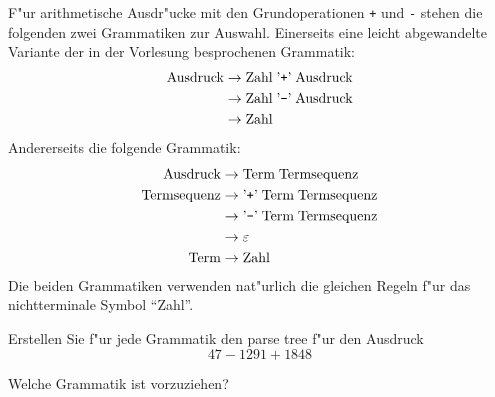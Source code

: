 F"ur arithmetische Ausdr"ucke mit den Grundoperationen
{\tt +} und {\tt -} stehen die folgenden zwei Grammatiken
zur Auswahl. Einerseits eine leicht abgewandelte Variante
der in der Vorlesung besprochenen Grammatik:
\begin{align*}
\text{Ausdruck}&\rightarrow \text{Zahl}\;\text{'{\tt +}'}\;\text{Ausdruck} \\
               &\rightarrow \text{Zahl}\;\text{'{\tt -}'}\;\text{Ausdruck} \\
               &\rightarrow \text{Zahl}
\end{align*}
Andererseits die folgende Grammatik:
\begin{align*}
\text{Ausdruck}&\rightarrow \text{Term}\;\text{Termsequenz}\\
\text{Termsequenz}&\rightarrow \text{'{\tt +}'}\; \text{Term}\; \text{Termsequenz}\\
                  &\rightarrow \text{'{\tt -}'}\; \text{Term}\; \text{Termsequenz}\\
                  &\rightarrow \varepsilon\\
 \text{Term}&\rightarrow \text{Zahl}
\end{align*}
Die beiden Grammatiken verwenden nat"urlich die gleichen Regeln
f"ur das nichtterminale Symbol ``Zahl''.
\begin{teilaufgaben}
\item Erstellen Sie f"ur jede Grammatik den parse tree f"ur den Ausdruck
\[
47-1291+1848
\]
\item Welche Grammatik ist vorzuziehen?
\end{teilaufgaben}

